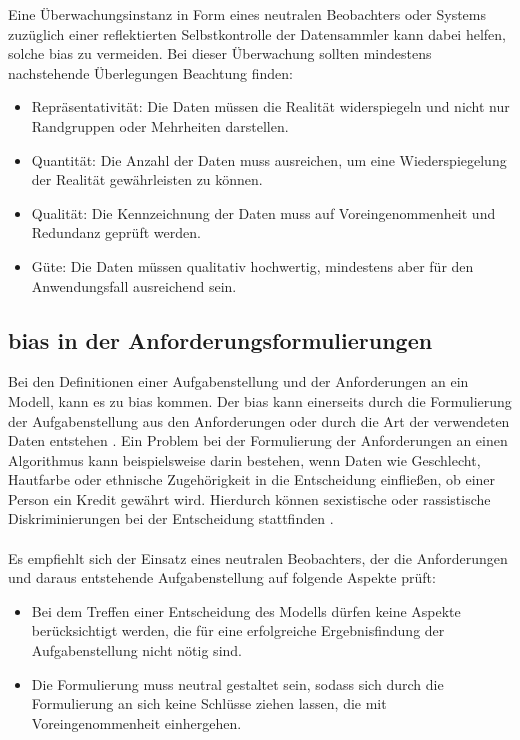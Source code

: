 \documentclass[hidelinks,12pt]{report}
\begin{document}
\newpage

Eine Überwachungsinstanz in Form eines neutralen Beobachters oder Systems zuzüglich einer reflektierten Selbstkontrolle der Datensammler kann dabei helfen, solche \Gls{bias}  zu vermeiden. Bei dieser Überwachung sollten mindestens nachstehende Überlegungen Beachtung finden: 
\\
\begin{itemize}
	\item Repräsentativität: Die Daten müssen die Realität widerspiegeln und nicht nur Randgruppen oder Mehrheiten darstellen.
	\item Quantität: Die Anzahl der Daten muss ausreichen,  um eine Wiederspiegelung der Realität gewährleisten zu können.
	\item Qualität: Die Kennzeichnung der Daten muss auf Voreingenommenheit und Redundanz geprüft werden.
	\item Güte: Die Daten müssen qualitativ hochwertig, mindestens aber für den Anwendungsfall ausreichend sein.
\end{itemize}

\subsection{\Gls{bias}  in der Anforderungsformulierungen}
Bei den Definitionen einer Aufgabenstellung und der Anforderungen an ein Modell, kann es zu \Gls{bias}  kommen. Der \Gls{bias} kann einerseits durch die Formulierung der Aufgabenstellung aus den Anforderungen oder durch die Art der verwendeten Daten entstehen \cite[S. 51f.]{Srinivasan}. Ein Problem bei der Formulierung der Anforderungen an einen Algorithmus kann beispielsweise darin bestehen, wenn Daten wie Geschlecht, Hautfarbe oder ethnische Zugehörigkeit in die Entscheidung einfließen, ob einer Person ein Kredit gewährt wird. Hierdurch können sexistische oder rassistische Diskriminierungen bei der Entscheidung stattfinden \cite[S. 51f.]{Srinivasan}.
\\\\
Es empfiehlt sich der Einsatz eines neutralen Beobachters, der die Anforderungen und daraus entstehende Aufgabenstellung auf folgende Aspekte prüft: \\%
\begin{itemize}
	\item Bei dem Treffen einer Entscheidung des Modells dürfen keine Aspekte berücksichtigt werden, die für eine erfolgreiche Ergebnisfindung der Aufgabenstellung nicht nötig sind.
	\item Die Formulierung muss neutral gestaltet sein, sodass sich durch die Formulierung an sich keine Schlüsse ziehen lassen, die mit Voreingenommenheit einhergehen.
\end{itemize}
\end{document}
